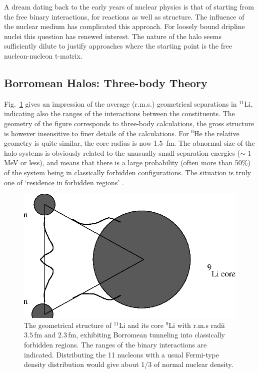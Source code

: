 A dream dating back to the early years of nuclear physics is that
of starting from the free binary interactions, for reactions as
well as structure. The influence of the nuclear  medium has
complicated this approach. For loosely bound dripline nuclei this
question has renewed interest. The nature of the halo seems
sufficiently dilute to justify approaches where the starting point
is the free nucleon-nucleon t-matrix.

\subsection{Borromean Halos: Three-body Theory}

Fig.~\ref{figLi11} gives an impression of the average (r.m.s.)
geometrical separations in $^{11}$Li, indicating also the ranges
of the interactions between the constituents. The geometry of the
figure corresponds to three-body calculations, the gross structure
is however insensitive to finer details of the calculations. For
$^6$He the relative geometry is quite similar, the core radius is
now 1.5~fm. The abnormal size of the halo systems is obviously
related to the unusually small separation energies ($\sim$ 1 MeV or
less), and means that there is a large probability (often more
than 50\%) of the system being in classically forbidden
configurations. The situation is truly one of `residence in
forbidden regions' \cite{riisager94}.

\begin{figure}[tbph]
\begin{center}
\includegraphics[scale=0.5]{figures/lithium2.eps}
\end{center}
\caption{The geometrical structure of $^{11}$Li and its core
$^9$Li
 with r.m.s radii $3.5\,$fm and $2.3\,$fm, exhibiting Borromean
 tunneling into classically forbidden regions.
 The ranges of the binary interactions are indicated.
 Distributing the 11 nucleons with a usual Fermi-type density
 distribution would give about 1/3 of normal nuclear density.}
\label{figLi11}
\end{figure}

